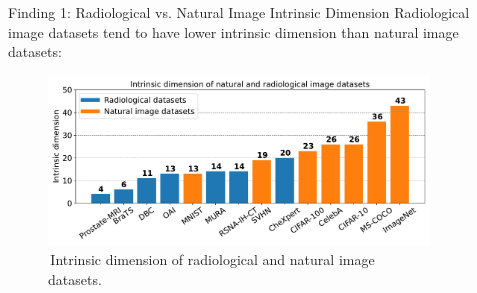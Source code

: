 \documentclass[final,hyperref={pdfpagelabels=false}]{beamer}
\begin{document}
\begin{frame}[t]
\begin{columns}[t]
\begin{column}{.47\textwidth}
\begin{block}{Finding 1: Radiological vs. Natural Image Intrinsic Dimension}
    Radiological image datasets tend to have lower intrinsic dimension than natural image datasets:
    \begin{figure}
        \includegraphics[width=0.95\linewidth]{frompaper/modified/ID.pdf}
        \caption{\,Intrinsic dimension of \textcolor{paperblue}{radiological} and \textcolor{paperorange}{natural} \cite{pope2021intrinsic} image datasets.}
    \end{figure}
\end{block}


\end{column} %
\begin{column}{.02\textwidth}\end{column} %

 
\begin{column}{.47\textwidth} %






\end{column}
\end{columns}
\end{frame}
\end{document}
